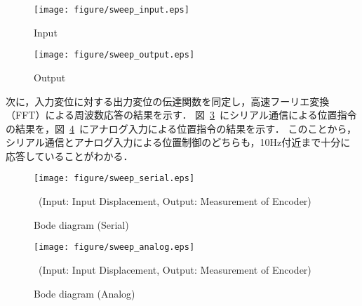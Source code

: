\documentclass[a4paper,12pt]{article_vdlab_sotsuron}
\begin{document}
\vspace*{12mm}
\begin{figure}[h]
  \begin{center}
    \texttt{[image: figure/sweep\_input.eps]}
    \vspace*{3mm}
    \caption{Input}
    \label{fig:sweep_input}
  \end{center}
\end{figure}

\vspace*{12mm}
 \begin{figure}[h]
  \begin{center}
    \texttt{[image: figure/sweep\_output.eps]}
    \vspace*{3mm}
    \caption{Output}
    \label{fig:sweep_output}
  \end{center}
\end{figure}

\newpage
次に，入力変位に対する出力変位の伝達関数を同定し，高速フーリエ変換（FFT）による周波数応答の結果を示す．
図~\ref{fig:sweep_serial}~にシリアル通信による位置指令の結果を，図~\ref{fig:sweep_analog}~にアナログ入力による位置指令の結果を示す．
このことから，シリアル通信とアナログ入力による位置制御のどちらも，10Hz付近まで十分に応答していることがわかる．
\begin{figure}[h]
  \begin{center}
   \texttt{[image: figure/sweep\_serial.eps]}
  \vspace{2mm}
\caption{Bode diagram (Serial)}
\  (Input: Input Displacement, Output: Measurement of Encoder)
  \label{fig:sweep_serial}
  \end{center}
\end{figure}
  \vspace{10mm}
\begin{figure}[h]
  \begin{center}
   \texttt{[image: figure/sweep\_analog.eps]}
  \vspace{2mm}
\caption{Bode diagram (Analog)}
\  (Input: Input Displacement, Output: Measurement of Encoder)
  \label{fig:sweep_analog}
  \end{center}
\end{figure}
\end{document}
